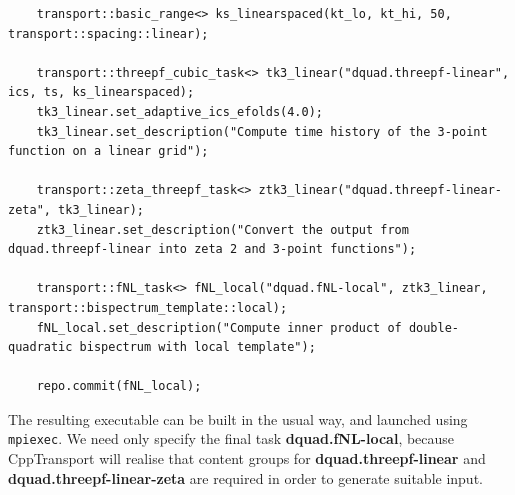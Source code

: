 \documentclass[11pt,a4paper]{article}
\newcommand{\repoobject}[1]{{\ttfamily\bfseries\small #1}}
\newcommand{\packagefont}{\sffamily}
\newcommand{\CppTransport}{{\packagefont CppTransport}}
\begin{document}
\begin{verbatim}
    transport::basic_range<> ks_linearspaced(kt_lo, kt_hi, 50, transport::spacing::linear);

    transport::threepf_cubic_task<> tk3_linear("dquad.threepf-linear", ics, ts, ks_linearspaced);
    tk3_linear.set_adaptive_ics_efolds(4.0);
    tk3_linear.set_description("Compute time history of the 3-point function on a linear grid");

    transport::zeta_threepf_task<> ztk3_linear("dquad.threepf-linear-zeta", tk3_linear);
    ztk3_linear.set_description("Convert the output from dquad.threepf-linear into zeta 2 and 3-point functions");

    transport::fNL_task<> fNL_local("dquad.fNL-local", ztk3_linear, transport::bispectrum_template::local);
    fNL_local.set_description("Compute inner product of double-quadratic bispectrum with local template");

    repo.commit(fNL_local);    
\end{verbatim}
The resulting executable can be built in the usual way,
and launched using \texttt{mpiexec}.
We need only specify the final
task \repoobject{dquad.fNL-local},
because {\CppTransport} will realise that content groups
for \repoobject{dquad.threepf-linear}
and \repoobject{dquad.threepf-linear-zeta}
are required in order to generate suitable input.
\end{document}
